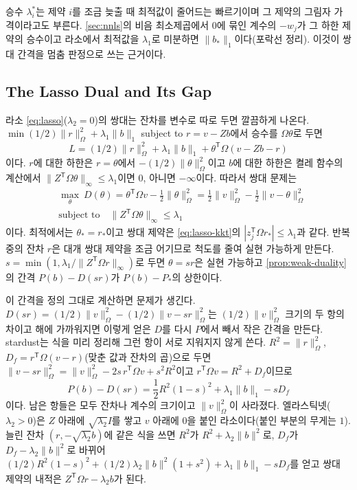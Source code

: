 승수 $\lambda_i^\ast$는 제약 $i$를 조금 늦출 때 최적값이 줄어드는 빠르기이며 그 제약의 그림자 가격이라고도 부른다. \cref{sec:nnls}의 비음 최소제곱에서 $0$에 묶인 계수의 $-w_j$가 그 하한 제약의 승수이고 라소에서 최적값을 $\lambda_1$로 미분하면 $\|b_\ast\|_1$이다(포락선 정리). 이것이 쌍대 간격을 멈춤 판정으로 쓰는 근거이다.

\subsection{The Lasso Dual and Its Gap}

라소 \cref{eq:lasso}($\lambda_2=0$)의 쌍대는 잔차를 변수로 따로 두면 깔끔하게 나온다. $\min(1/2)\|r\|_\Omega^2+\lambda_1\|b\|_1$ subject to $r=v-Zb$에서 승수를 $\Omega\theta$로 두면
\[
L=(1/2)\|r\|_\Omega^2+\lambda_1\|b\|_1+\theta^{\mathsf T}\Omega(v-Zb-r)
\]
이다. $r$에 대한 하한은 $r=\theta$에서 $-(1/2)\|\theta\|_\Omega^2$이고 $b$에 대한 하한은 켤레 함수의 계산에서 $\|Z^{\mathsf T}\Omega\theta\|_\infty\le\lambda_1$이면 $0$, 아니면 $-\infty$이다. 따라서 쌍대 문제는
\begin{equation}
\label{eq:lasso-dual}
\begin{aligned}
&\max_\theta\ D(\theta)=\theta^{\mathsf T}\Omega v-\frac12\|\theta\|_\Omega^2=\frac12\|v\|_\Omega^2-\frac12\|v-\theta\|_\Omega^2\\
&\text{subject to}\quad\|Z^{\mathsf T}\Omega\theta\|_\infty\le\lambda_1
\end{aligned}
\end{equation}
이다. 최적에서는 $\theta_\ast=r_\ast$이고 쌍대 제약은 \cref{eq:lasso-kkt}의 $|z_j^{\mathsf T}\Omega r_\ast|\le\lambda_1$과 같다. 반복 중의 잔차 $r$은 대개 쌍대 제약을 조금 어기므로 척도를 줄여 실현 가능하게 만든다. $s=\min(1,\lambda_1/\|Z^{\mathsf T}\Omega r\|_\infty)$로 두면 $\theta=sr$은 실현 가능하고 \cref{prop:weak-duality}의 간격 $P(b)-D(sr)$가 $P(b)-P_\ast$의 상한이다.

이 간격을 정의 그대로 계산하면 문제가 생긴다. $D(sr)=(1/2)\|v\|_\Omega^2-(1/2)\|v-sr\|_\Omega^2$는 $(1/2)\|v\|_\Omega^2$ 크기의 두 항의 차이고 해에 가까워지면 이렇게 얻은 $D$를 다시 $P$에서 빼서 작은 간격을 만든다. stardust는 식을 미리 정리해 그런 항이 서로 지워지지 않게 쓴다. $R^2=\|r\|_\Omega^2$, $D_f=r^{\mathsf T}\Omega(v-r)$(맞춘 값과 잔차의 곱)으로 두면 $\|v-sr\|_\Omega^2=\|v\|_\Omega^2-2s\,r^{\mathsf T}\Omega v+s^2R^2$이고 $r^{\mathsf T}\Omega v=R^2+D_f$이므로
\begin{equation}
\label{eq:gap-stable}
P(b)-D(sr)=\frac12R^2(1-s)^2+\lambda_1\|b\|_1-sD_f
\end{equation}
이다. 남은 항들은 모두 잔차나 계수의 크기이고 $\|v\|_\Omega^2$이 사라졌다. 엘라스틱넷($\lambda_2>0$)은 $Z$ 아래에 $\sqrt{\lambda_2}I$를 쌓고 $v$ 아래에 $0$을 붙인 라소이다(붙인 부분의 무게는 $1$). 늘린 잔차 $(r,-\sqrt{\lambda_2}b)$에 같은 식을 쓰면 $R^2$가 $R^2+\lambda_2\|b\|^2$로, $D_f$가 $D_f-\lambda_2\|b\|^2$로 바뀌어 $(1/2)R^2(1-s)^2+(1/2)\lambda_2\|b\|^2(1+s^2)+\lambda_1\|b\|_1-sD_f$를 얻고 쌍대 제약의 내적은 $Z^{\mathsf T}\Omega r-\lambda_2b$가 된다.

